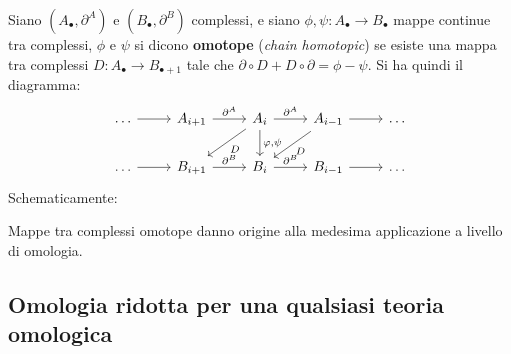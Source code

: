 \begin{definition}
  Siano $ (A_\bullet, \partial^A) $ e $ (B_\bullet, \partial^B) $ complessi, e siano $ \phi, \psi \colon A_\bullet \to B_\bullet $
  mappe continue tra complessi, $ \phi $ e $ \psi $ si dicono \textbf{omotope}
  (\emph{chain homotopic}) se esiste una mappa tra complessi $ D \colon A_\bullet \to B_{\bullet + 1} $
  tale che $ \partial \circ D + D \circ \partial = \phi - \psi $. Si ha quindi il diagramma:
  \[
    \begin{tikzcd}
      \dots \rar & A_{i+1} \rar{\partial^A} & A_i \rar{\partial^A} \arrow{dl}{D} \dar{\phi,\psi} & A_{i-1} \rar \arrow{dl}{D}  & \dots \\
      \dots \rar & B_{i+1} \rar{\partial^B} & B_i \rar{\partial^B} & B_{i-1} \rar & \dots
    \end{tikzcd}
  \]
  Schematicamente:
  \begin{figure}[h]
    \centering
  \end{figure}
\end{definition}
Mappe tra complessi omotope danno origine alla medesima applicazione a livello
di omologia.

\subsection{Omologia ridotta per una qualsiasi teoria omologica}

